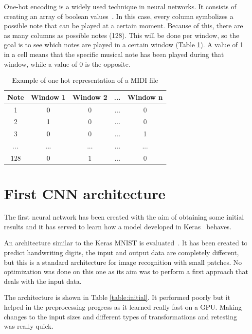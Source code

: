 One-hot encoding is a widely used technique in neural networks. It consists of creating an array of boolean values~\cite{one-hot}. In this case, every column symbolizes a possible note that can be played at a certain moment. Because of this, there are as many columns as possible notes (128). This will be done per window, so the goal is to see which notes are played in a certain window (Table \ref{table:one_hot}). A value of 1 in a cell means that the specific musical note has been played during that window, while a value of 0 is the opposite.

\begin{table}
	\centering
	\caption{Example of one hot representation of a MIDI file}
	\begin{tabular}{||c c c c c||} 
		\hline
		Note & Window 1 & Window 2 & ... & Window n \\ [0.5ex] 
		\hline\hline
		1 & 0 & 0 & ... & 0 \\ 
		\hline
		2 & 1 & 0 & ... & 0 \\
		\hline
		3 & 0 & 0 & ... & 1 \\
		\hline
		... & ... & ... & ... & ... \\
		\hline
		128 & 0 & 1 & ... & 0 \\ [1ex] 
		\hline
	\end{tabular}
	\label{table:one_hot}
\end{table}

\section{First CNN architecture}
The first neural network has been created with the aim of obtaining some initial results and it has served to learn how a model developed in Keras~\cite{keras} behaves.
\par
An architecture similar to the Keras MNIST is evaluated~\cite{keras_mnist}. It has been created to predict handwriting digits, the input and output data are completely different, but this is a standard architecture for image recognition with small patches. No optimization was done on this one as its aim was to perform a first approach that deals with the input data. 
\par

The architecture is shown in Table \ref{table:initial}. It performed poorly but it helped in the preprocessing progress as it learned really fast on a GPU. Making changes to the input sizes and different types of transformations and retesting was really quick.


